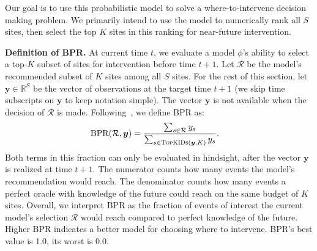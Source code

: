 
Our goal is to use this probabilistic model to solve a where-to-intervene decision making problem. We primarily intend to use the model to numerically rank all $S$ sites, then select the top $K$ sites in this ranking for near-future intervention. 


\textbf{Definition of BPR.}
At current time $t$, we evaluate a model $\phi$'s ability to select a top-$K$ subset of sites for intervention before time $t+1$. 
Let $\mathcal{R}$ be the model's recommended subset of $K$ sites among all $S$ sites.
For the rest of this section, let $\bm{y} \in \mathbb{R}^S$ be the vector of observations at the target time $t+1$ (we skip time subscripts on $\bm{y}$ to keep notation simple).
The vector $\bm{y}$ is not available when the decision of $\mathcal{R}$ is made.
Following~\citet{heutonZIGP2022}, we define BPR as:
\begin{align}
    \text{BPR}( 
    \mathcal{R}, \bm{y}) &= 
    \label{eq:bpr}
    \frac
        { \sum_{s \in \mathcal{R}} y_{s}}
        { \sum_{s \in \textsc{TopKIDs}(\bm{y}, K)} y_{s}}.
\end{align}
Both terms in this fraction can only be evaluated in hindsight, after the vector $\bm{y}$ is realized at time $t+1$.
The numerator counts how many events the model's recommendation would reach. 
The denominator counts how many events a perfect oracle with knowledge of the future could reach on the same budget of $K$ sites.
Overall, we interpret BPR as the fraction of events of interest the current model's selection $\mathcal{R}$ would reach compared to perfect knowledge of the future.
Higher BPR indicates a better model for choosing where to intervene. BPR's best value is 1.0, its worst is 0.0.

